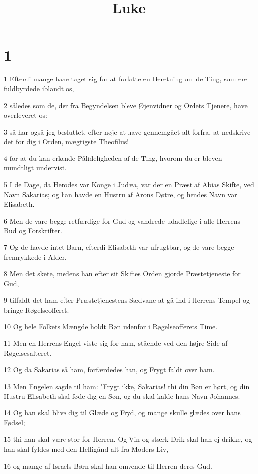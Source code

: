 

\title{Luke}


\chapter{1}

\par 1 Efterdi mange have taget sig for at forfatte en Beretning om de Ting, som ere fuldbyrdede iblandt os,
\par 2 således som de, der fra Begyndelsen bleve Øjenvidner og Ordets Tjenere, have overleveret os:
\par 3 så har også jeg besluttet, efter nøje at have gennemgået alt forfra, at nedskrive det for dig i Orden, mægtigste Theofilus!
\par 4 for at du kan erkende Pålideligheden af de Ting, hvorom du er bleven mundtligt undervist.
\par 5 I de Dage, da Herodes var Konge i Judæa, var der en Præst af Abias Skifte, ved Navn Sakarias; og han havde en Hustru af Arons Døtre, og hendes Navn var Elisabeth.
\par 6 Men de vare begge retfærdige for Gud og vandrede udadlelige i alle Herrens Bud og Forskrifter.
\par 7 Og de havde intet Barn, efterdi Elisabeth var ufrugtbar, og de vare begge fremrykkede i Alder.
\par 8 Men det skete, medens han efter sit Skiftes Orden gjorde Præstetjeneste for Gud,
\par 9 tilfaldt det ham efter Præstetjenestens Sædvane at gå ind i Herrens Tempel og bringe Røgelseofferet.
\par 10 Og hele Folkets Mængde holdt Bøn udenfor i Røgelseofferets Time.
\par 11 Men en Herrens Engel viste sig for ham, stående ved den højre Side af Røgelsesalteret.
\par 12 Og da Sakarias så ham, forfærdedes han, og Frygt faldt over ham.
\par 13 Men Engelen sagde til ham: "Frygt ikke, Sakarias! thi din Bøn er hørt, og din Hustru Elisabeth skal føde dig en Søn, og du skal kalde hans Navn Johannes.
\par 14 Og han skal blive dig til Glæde og Fryd, og mange skulle glædes over hans Fødsel;
\par 15 thi han skal være stor for Herren. Og Vin og stærk Drik skal han ej drikke, og han skal fyldes med den Helligånd alt fra Moders Liv,
\par 16 og mange af Israels Børn skal han omvende til Herren deres Gud.
